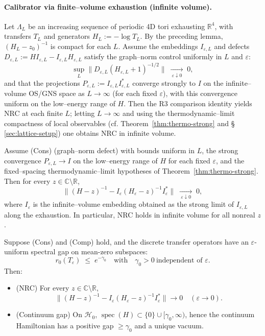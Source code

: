 \documentclass[11pt]{amsart}
\begin{document}
\paragraph{Calibrator via finite–volume exhaustion (infinite volume).}
Let $\Lambda_L$ be an increasing sequence of periodic 4D tori exhausting $\mathbb R^4$, with transfers $T_L$ and generators $H_L:=-\log T_L$. By the preceding lemma, $(H_L-z_0)^{-1}$ is compact for each $L$. Assume the embeddings $I_{\varepsilon,L}$ and defects $D_{\varepsilon,L}:=H I_{\varepsilon,L}-I_{\varepsilon,L} H_{\varepsilon,L}$ satisfy the graph–norm control uniformly in $L$ and $\varepsilon$:
\[
  \sup_L\big\| D_{\varepsilon,L} (H_{\varepsilon,L}+1)^{-1/2}\big\|\;\xrightarrow[\ \varepsilon\downarrow 0\ ]{}\;0,
\]
and that the projections $P_{\varepsilon,L}:=I_{\varepsilon,L} I_{\varepsilon,L}^*$ converge strongly to $I$ on the infinite–volume OS/GNS space as $L\to\infty$ (for each fixed $\varepsilon$), with this convergence uniform on the low–energy range of $H$. Then the R3 comparison identity yields NRC at each finite $L$; letting $L\to\infty$ and using the thermodynamic–limit compactness of local observables (cf. Theorem~\ref{thm:thermo-strong} and \S\,\ref{sec:lattice-setup}) one obtains NRC in infinite volume.

\begin{theorem}
Assume (Cons) (graph–norm defect) with bounds uniform in $L$, the strong convergence $P_{\varepsilon,L}\to I$ on the low–energy range of $H$ for each fixed $\varepsilon$, and the fixed–spacing thermodynamic–limit hypotheses of Theorem~\ref{thm:thermo-strong}. Then for every $z\in\mathbb C\setminus\mathbb R$,
\[
  \big\|(H-z)^{-1}-I_{\varepsilon}(H_{\varepsilon}-z)^{-1}I_{\varepsilon}^*\big\|\;\xrightarrow[\ \varepsilon\downarrow 0\ ]{}\;0,
\]
where $I_{\varepsilon}$ is the infinite–volume embedding obtained as the strong limit of $I_{\varepsilon,L}$ along the exhaustion. In particular, NRC holds in infinite volume for all nonreal $z$.
\end{theorem}

\begin{theorem}
Suppose (Cons) and (Comp) hold, and the discrete transfer operators have an $\varepsilon$-uniform spectral gap on mean-zero subspaces:
\[
  r_0(T_{\varepsilon})\;\le\;e^{-\gamma_0}\quad\text{with}\quad \gamma_0>0\ \text{independent of }\varepsilon.
\]
Then:
\begin{itemize}
  \item (NRC) For every $z\in\mathbb C\setminus\mathbb R$,
  \[
    \bigl\|(H-z)^{-1}-I_{\varepsilon}(H_{\varepsilon}-z)^{-1}I_{\varepsilon}^*\bigr\|\to 0\quad(\varepsilon\to 0).
  \]
  \item (Continuum gap) On $\mathcal H_0$, $\operatorname{spec}(H)\subset\{0\}\cup[\gamma_0,\infty)$, hence the continuum Hamiltonian has a positive gap $\ge \gamma_0$ and a unique vacuum.
\end{itemize}
\end{theorem}
\end{document}
